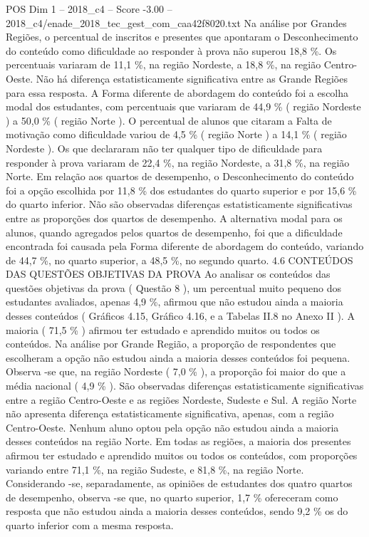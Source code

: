 \begin{textsample}{POS Dim 1 – 2018\_c4 – Score -3.00 – 2018\_c4/enade\_2018\_tec\_gest\_com\_caa42f8020.txt}
Na análise por Grandes Regiões, o percentual de inscritos e presentes que apontaram o Desconhecimento do conteúdo como dificuldade ao responder à prova não superou 18,8 \%.
Os percentuais variaram de 11,1 \%, na região Nordeste, a 18,8 \%, na região Centro-Oeste.
Não há diferença estatisticamente significativa entre as Grande Regiões para essa resposta.
A Forma diferente de abordagem do conteúdo foi a escolha modal dos estudantes, com percentuais que variaram de 44,9 \% ( região Nordeste ) a 50,0 \% ( região Norte ).
O percentual de alunos que citaram a Falta de motivação como dificuldade variou de 4,5 \% ( região Norte ) a 14,1 \% ( região Nordeste ).
Os que declararam não ter qualquer tipo de dificuldade para responder à prova variaram de 22,4 \%, na região Nordeste, a 31,8 \%, na região Norte.
Em relação aos quartos de desempenho, o Desconhecimento do conteúdo foi a opção escolhida por 11,8 \% dos estudantes do quarto superior e por 15,6 \% do quarto inferior.
Não são observadas diferenças estatisticamente significativas entre as proporções dos quartos de desempenho.
A alternativa modal para os alunos, quando agregados pelos quartos de desempenho, foi que a dificuldade encontrada foi causada pela Forma diferente de abordagem do conteúdo, variando de 44,7 \%, no quarto superior, a 48,5 \%, no segundo quarto. 4.6 CONTEÚDOS DAS QUESTÕES OBJETIVAS DA PROVA Ao analisar os conteúdos das questões objetivas da prova ( Questão 8 ), um percentual muito pequeno dos estudantes avaliados, apenas 4,9 \%, afirmou que não estudou ainda a maioria desses conteúdos ( Gráficos 4.15, Gráfico 4.16, e a Tabelas II.8 no Anexo II ).
A maioria ( 71,5 \% ) afirmou ter estudado e aprendido muitos ou todos os conteúdos.
Na análise por Grande Região, a proporção de respondentes que escolheram a opção não estudou ainda a maioria desses conteúdos foi pequena.
Observa -se que, na região Nordeste ( 7,0 \% ), a proporção foi maior do que a média nacional ( 4,9 \% ).
São observadas diferenças estatisticamente significativas entre a região Centro-Oeste e as regiões Nordeste, Sudeste e Sul.
A região Norte não apresenta diferença estatisticamente significativa, apenas, com a região Centro-Oeste.
Nenhum aluno optou pela opção não estudou ainda a maioria desses conteúdos na região Norte.
Em todas as regiões, a maioria dos presentes afirmou ter estudado e aprendido muitos ou todos os conteúdos, com proporções variando entre 71,1 \%, na região Sudeste, e 81,8 \%, na região Norte.
Considerando -se, separadamente, as opiniões de estudantes dos quatro quartos de desempenho, observa -se que, no quarto superior, 1,7 \% ofereceram como resposta que não estudou ainda a maioria desses conteúdos, sendo 9,2 \% os do quarto inferior com a mesma resposta.

\end{textsample}
